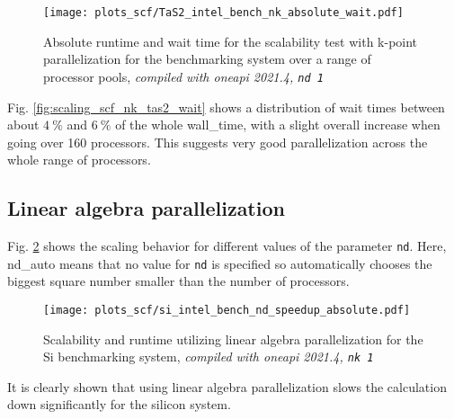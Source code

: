 \documentclass[main.tex]{subfiles}
\begin{document}
\begin{figure}[ht!]
    \centering
    \texttt{[image: plots\_scf/TaS2\_intel\_bench\_nk\_absolute\_wait.pdf]}
    \caption{Absolute runtime and wait time for the scalability test with k-point parallelization for the \TaS benchmarking system over a range of processor pools, \emph{\QE compiled with \gls{oneapi} 2021.4, \texttt{nd 1}}}
    \label{fig:scaling_scf_nk_tas2_absolute_wait}
\end{figure}
Fig. \ref{fig:scaling_scf_nk_tas2_wait} shows a distribution of wait times between about \(\SI{4}{\percent}\) and \(\SI{6}{\percent}\) of the whole \gls{wall_time}, with a slight overall increase when going over 160 processors.
This suggests very good parallelization across the whole range of processors.


\subsection{Linear algebra parallelization}

Fig. \ref{fig:scaling_scf_nd_si} shows the scaling behavior for different values of the parameter \texttt{nd}.
Here, nd\_auto means that no value for \texttt{nd} is specified so \QE automatically chooses the biggest square number smaller than the number of processors.
\begin{figure}[ht!]
    \centering
    \texttt{[image: plots\_scf/si\_intel\_bench\_nd\_speedup\_absolute.pdf]}
\label{fig:scaling_scf_nd_si}
\caption{Scalability and runtime utilizing linear algebra parallelization for the Si benchmarking system, \emph{\QE compiled with \gls{oneapi} 2021.4, \texttt{nk 1}}}
\end{figure}
It is clearly shown that using linear algebra parallelization slows the calculation down significantly for the silicon system.
\end{document}
